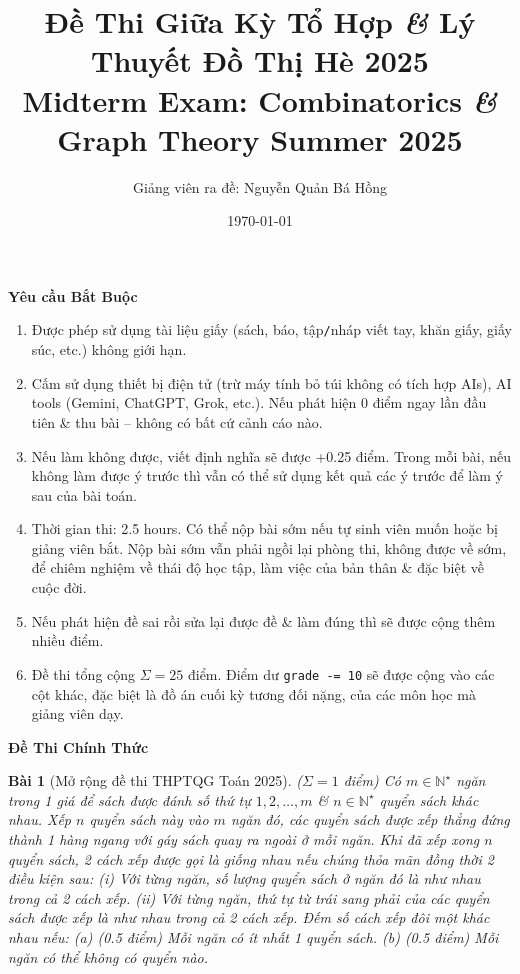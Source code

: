 \documentclass{article}
\title{Đề Thi Giữa Kỳ Tổ Hợp {\it\&} Lý Thuyết Đồ Thị Hè 2025\\Midterm Exam: Combinatorics {\it\&} Graph Theory Summer 2025}
\author{Giảng viên ra đề: Nguyễn Quản Bá Hồng}
\date{\today}
\newtheorem{baitoan}{Bài}
\begin{document}
\maketitle
\begin{center}\large
    \textbf{\textsf{Yêu cầu Bắt Buộc}}
\end{center}

\begin{enumerate}
    \item Được phép sử dụng tài liệu giấy (sách, báo, tập{\tt/}nháp viết tay, khăn giấy, giấy súc, etc.) không giới hạn.
    \item Cấm sử dụng thiết bị điện tử (trừ máy tính bỏ túi không có tích hợp AIs), AI tools (Gemini, ChatGPT, Grok, etc.). Nếu phát hiện 0 điểm ngay lần đầu tiên \& thu bài -- không có bất cứ cảnh cáo nào.
    \item Nếu làm không được, viết định nghĩa sẽ được +0.25 điểm. Trong mỗi bài, nếu không làm được ý trước thì vẫn có thể sử dụng kết quả các ý trước để làm ý sau của bài toán.
    \item Thời gian thi: 2.5 hours. Có thể nộp bài sớm nếu tự sinh viên muốn hoặc bị giảng viên bắt. Nộp bài sớm vẫn phải ngồi lại phòng thi, không được về sớm, để chiêm nghiệm về thái độ học tập, làm việc của bản thân \& đặc biệt về cuộc đời.
    \item Nếu phát hiện đề sai rồi sửa lại được đề \& làm đúng thì sẽ được cộng thêm nhiều điểm.
    \item Đề thi tổng cộng $\Sigma = 25$ điểm. Điểm dư {\tt grade -= 10} sẽ được cộng vào các cột khác, đặc biệt là đồ án cuối kỳ tương đối nặng, của các môn học mà giảng viên dạy.
\end{enumerate}

\begin{center}\large
    \textbf{\textsf{Đề Thi Chính Thức}}
\end{center}

\begin{baitoan}[Mở rộng đề thi THPTQG Toán 2025]
    {\rm($\Sigma = 1$ điểm)} Có $m\in\mathbb{N}^\star$ ngăn trong 1 giá để sách được đánh số thứ tự $1,2,\ldots,m$ \& $n\in\mathbb{N}^\star$ quyển sách khác nhau. Xếp $n$ quyển sách này vào $m$ ngăn đó, các quyển sách được xếp thẳng đứng thành 1 hàng ngang với gáy sách quay ra ngoài ở mỗi ngăn. Khi đã xếp xong $n$ quyển sách, 2 cách xếp được gọi là {\rm giống nhau} nếu chúng thỏa mãn đồng thời 2 điều kiện sau: (i) Với từng ngăn, số lượng quyển sách ở ngăn đó là như nhau trong cả 2 cách xếp. (ii) Với từng ngăn, thứ tự từ trái sang phải của các quyển sách được xếp là như nhau trong cả 2 cách xếp. Đếm số cách xếp đôi một khác nhau nếu: (a) {\rm(0.5 điểm)} Mỗi ngăn có ít nhất 1 quyển sách. (b) {\rm(0.5 điểm)} Mỗi ngăn có thể không có quyển nào.
\end{baitoan}
\end{document}
